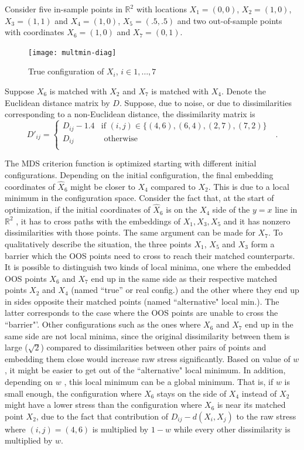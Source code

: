 \documentclass[12pt,oneside,final]{thesis}\usepackage[]{graphicx}\usepackage[]{color}
\begin{document}
Consider five in-sample points in $\mathbb{R}^2$ with locations $X_1=(0,0)$, $X_2=(1,0)$, $X_3=(1,1)$
and $X_4=(1,0)$, $X_5=(.5,.5)$ and two out-of-sample  points with coordinates $X_6=(1,0)$ and $X_7=(0,1)$.
\begin{figure}
\centering
\texttt{[image: multmin-diag]}
\caption{True configuration of $X_{i}$, $i \in {1,\ldots,7}$}
\label{original-config}
\end{figure} 
Suppose $X_6$ is matched with $X_2$ and $X_7$ is matched with $X_4$. 
Denote the Euclidean distance matrix by $D$. 
Suppose, due to noise, or due to dissimilarities corresponding to a non-Euclidean distance, 
the dissimilarity matrix is $$D'_{ij}=\begin{cases}
D_{ij}-1.4 & \textrm{if  $(i,j) \in \{(4,6),(6,4),(2,7),(7,2)   \}$ }\\
D_{ij}  & \textrm{ otherwise}\\
\end{cases}.$$ 

The MDS criterion function is optimized starting with different initial configurations.   Depending on the initial configuration, the final embedding coordinates of $\hat{X}_6$ might be closer
to $X_4$ compared to $X_2$. This is due to a local minimum in the configuration space. Consider the fact that, at the start of optimization, if  the initial coordinates of $\hat{X}_6$ is on the $X_4$ side of the $y=x$ line  in  $\mathbb{R}^2$ , 
it has to cross paths with the embeddings of  ${X}_1,{X}_3,{X}_5$ and it has   nonzero dissimilarities with those points. The same argument can be made for $X_7$. To qualitatively describe the situation, the three points $X_1$, $X_5$ and $X_3$ form a barrier which the OOS points need to cross  to reach their matched counterparts. 
It is possible to distinguish two kinds of local minima, one where the embedded OOS points $X_6$ and $X_7$ end up in the same side as their respective matched points $X_2$ and $X_4$ (named ``true'' or real config.) and the other where they end up in sides  opposite their matched points (named ``alternative" local min.). The latter corresponds to the case where the OOS points are unable to cross the ``barrier"'. Other configurations such as the ones where $X_6$ and $X_7$  end up in the same side are not local minima, since the original dissimilarity between them is large ($\sqrt{2}$) compared to dissimilarities between other pairs of points and embedding them close would increase raw stress significantly.
Based on value of $w$, it might be easier to get out of the  ``alternative" local minimum. 
In addition, depending on $w$ , this  local minimum can be a global minimum. 
That is, if $w$ is small enough, the configuration where $X_6$ stays on the side of $X_4$ instead of $X_2$ might have a lower stress than the configuration where $X_6$ is near its matched point $X_2$, due to the fact that  contribution of $ D_{ij}-d(X_i,X_j)$ to the raw stress where $(i,j)=(4,6)$  is  multiplied by $1-w$ while every other dissimilarity is multiplied by $w$. 
\end{document}
